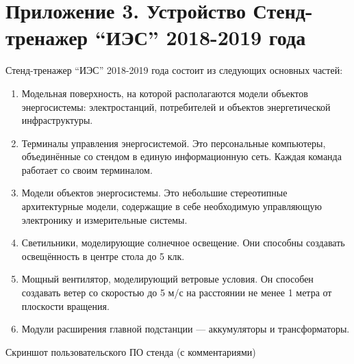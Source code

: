 \section*{Приложение 3. Устройство Стенд-тренажер “ИЭС” 2018-2019 года}

Стенд-тренажер “ИЭС” 2018-2019 года состоит из следующих основных частей:

\begin{enumerate}
    \item Модельная поверхность, на которой располагаются модели объектов энергосистемы: электростанций, потребителей и объектов энергетической инфраструктуры.
    \item Терминалы управления энергосистемой. Это персональные компьютеры, объединённые со стендом в единую информационную сеть. Каждая команда работает со своим терминалом.
    \item Модели объектов энергосистемы. Это небольшие стереотипные архитектурные модели, содержащие в себе необходимую управляющую электронику и измерительные системы.
    \item Светильники, моделирующие солнечное освещение. Они способны создавать освещённость в центре стола до 5 клк.
    \item Мощный вентилятор, моделирующий ветровые условия. Он способен создавать ветер со скоростью до 5 м/с на расстоянии не менее 1 метра от плоскости вращения.
    \item Модули расширения главной подстанции — аккумуляторы и трансформаторы.        
\end{enumerate}


\center Скриншот пользовательского ПО стенда (с комментариями)